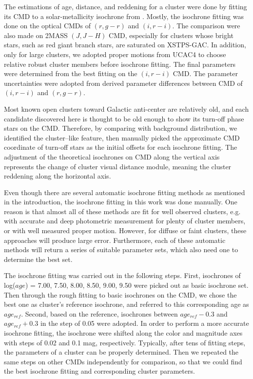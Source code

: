\documentclass[]{raa_rb}
\begin{document}
The estimations of age, distance, and reddening for a cluster were done by fitting its CMD to a solar-metallicity isochrone from \cite{Girardi2002}. Mostly, the isochrone fitting was done on the optical CMDs of $(r, g-r)$ and $(i, r-i)$. The comparison were also made on 2MASS $(J, J-H)$ CMD, especially for clusters whose bright stars, such as red giant branch stars, are saturated on XSTPS-GAC. In addition, only for large clusters, we adopted proper motions from UCAC4 to choose relative robust cluster members before isochrone fitting.  The final parameters were determined from the best fitting on the $(i, r-i)$ CMD.  The parameter uncertainties were adopted from derived parameter differences between CMD of $(i,r-i)$ and $(r, g-r)$.

Most known open clusters toward Galactic anti-center are relatively old, and each candidate discovered here is thought to be old enough to show its turn-off phase stars on the CMD. Therefore, by comparing with background distribution, we identified the cluster--like feature, then manually picked the approximate CMD coordinate of turn-off stars as the initial offsets for each isochrone fitting. The adjustment of the theoretical isochrones on CMD along the vertical axis represents the change of cluster visual distance module, meaning the cluster reddening along the horizontal axis. 


Even though there are several automatic isochrone fitting methods as mentioned in the introduction, the isochrone fitting in this work was done manually. One reason is that almost all of these methods are fit for well observed clusters, e.g. with accurate and deep photometric measurement for plenty of cluster members, or with well measured proper motion. However, for diffuse or faint clusters, these approaches will produce large error. Furthermore, each of these automatic methods will return a series of suitable parameter sets, which also need one to determine the best set. 



The isochrone fitting was carried out in the following steps.  First, isochrones of log($age$) = 7.00, 7.50, 8.00, 8.50, 9.00, 9.50 were picked out as basic isochrone set. Then through the rough fitting to basic isochrones on the CMD, we chose the best one as cluster's reference isochrone, and referred to this corresponding age as $age_{ref}$.  Second, based on the reference, isochrones between $age_{ref} - 0.3$ and $age_{ref} +0.3$  in the step of 0.05 were adopted. In order to perform a more accurate isochrone fitting, the isochrone were shifted along the color and magnitude axes with steps of 0.02 and 0.1 mag, respectively. Typically, after tens of fitting steps, the parameters of a cluster can be properly determined. Then we repeated the same steps on other CMDs independently for comparison, so that we could find the best isochrone fitting and corresponding cluster parameters.  
\end{document}
